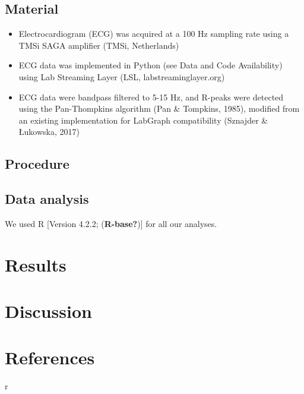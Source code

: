 \documentclass[
  man]{apa6}
\begin{document}
\hypertarget{material}{%
\subsection{Material}\label{material}}

\begin{itemize}
\item
  Electrocardiogram (ECG) was acquired at a 100 Hz sampling rate using a TMSi SAGA amplifier (TMSi, Netherlands)
\item
  ECG data was implemented in Python (see Data and Code Availability) using Lab Streaming Layer (LSL, labstreaminglayer.org)
\item
  ECG data were bandpass filtered to 5-15 Hz, and R-peaks were detected using the Pan-Thompkins algorithm (Pan \& Tompkins, 1985), modified from an existing implementation for LabGraph compatibility (Sznajder \& Łukowska, 2017)
\end{itemize}

\hypertarget{procedure}{%
\subsection{Procedure}\label{procedure}}

\hypertarget{data-analysis}{%
\subsection{Data analysis}\label{data-analysis}}

We used R {[}Version 4.2.2; (\textbf{R-base?}){]} for all our analyses.

\hypertarget{results}{%
\section{Results}\label{results}}

\hypertarget{discussion}{%
\section{Discussion}\label{discussion}}

\newpage

\hypertarget{references}{%
\section{References}\label{references}}

r
\end{document}
